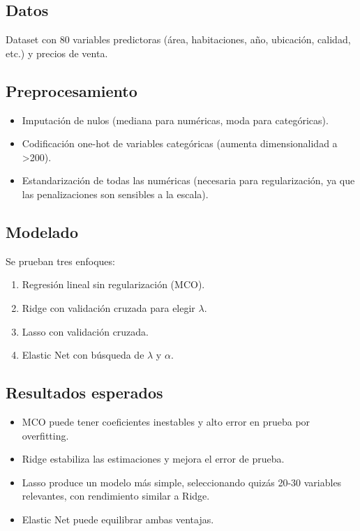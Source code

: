 \documentclass[12pt,a4paper,openany,oneside]{book}
\begin{document}
\subsection{Datos}
Dataset con 80 variables predictoras (área, habitaciones, año, ubicación, calidad, etc.) y precios de venta.

\subsection{Preprocesamiento}
\begin{itemize}
    \item Imputación de nulos (mediana para numéricas, moda para categóricas).
    \item Codificación one-hot de variables categóricas (aumenta dimensionalidad a >200).
    \item Estandarización de todas las numéricas (necesaria para regularización, ya que las penalizaciones son sensibles a la escala).
\end{itemize}

\subsection{Modelado}
Se prueban tres enfoques:
\begin{enumerate}
    \item Regresión lineal sin regularización (MCO).
    \item Ridge con validación cruzada para elegir \(\lambda\).
    \item Lasso con validación cruzada.
    \item Elastic Net con búsqueda de \(\lambda\) y \(\alpha\).
\end{enumerate}

\subsection{Resultados esperados}
\begin{itemize}
    \item MCO puede tener coeficientes inestables y alto error en prueba por overfitting.
    \item Ridge estabiliza las estimaciones y mejora el error de prueba.
    \item Lasso produce un modelo más simple, seleccionando quizás 20-30 variables relevantes, con rendimiento similar a Ridge.
    \item Elastic Net puede equilibrar ambas ventajas.
\end{itemize}
\end{document}
